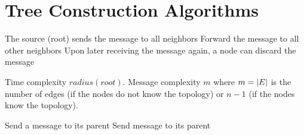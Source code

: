 \documentclass[11pt, oneside]{book}   						%
\begin{document}
\section{Tree Construction Algorithms}
\textbf{}
\begin{algorithm}
\caption{}\label{flooding}
\begin{algorithmic}[1]
\State The source (root) sends the message to all neighbors
	\State Forward the message to all other neighbors
\EndForEach
\State Upon later receiving the message again, a node can discard the message
\end{algorithmic}
\end{algorithm}
\begin{mythm} Time complexity $radius(root)$. Message complexity $m$ where $m=\left\vert E \right\vert$ is the number of edges (if the nodes do not know the topology) or $n-1$ (if the nodes know the topology).\end{mythm}

\begin{algorithm}
\caption{}\label{echo}
\begin{algorithmic}[1]
\ForEach[leaf $v$]
	\State Send a message to its parent
\EndForEach
{}
	\State Send message to its parent
\EndForEach
\end{algorithmic}
\end{algorithm}
\end{document}
